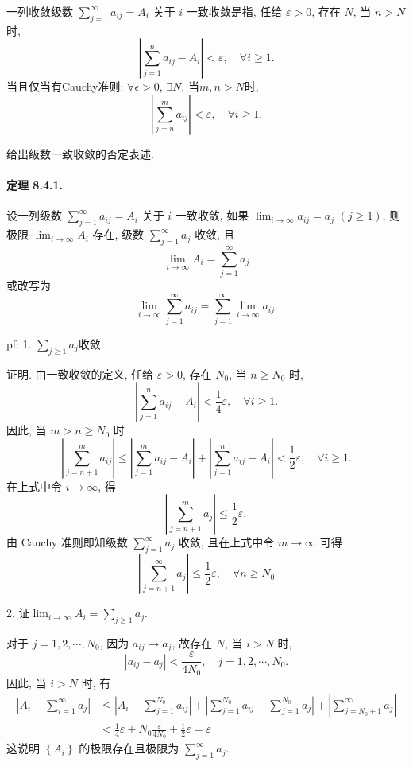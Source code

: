 一列收敛级数 $\sum_{j=1}^{\infty}a_{ij}=A_{i}$ 关于 $i$ 一致收敛是指, 任给 $\varepsilon>0$,
存在 $N$, 当 $n>N$ 时, 
\[
\left|\sum_{j=1}^{n}a_{ij}-A_{i}\right|<\varepsilon,\quad\forall i\geqslant1.
\]
当且仅当有Cauchy准则: $\forall\epsilon>0$, $\exists N$, 当$m,n>N$时, 
\[
\left|\sum_{j=n}^{m}a_{ij}\right|<\varepsilon,\quad\forall i\geqslant1.
\]

给出级数一致收敛的否定表述.

\paragraph{定理 8.4.1. }

设一列级数 $\sum_{j=1}^{\infty}a_{ij}=A_{i}$ 关于 $i$ 一致收敛, 如果 $\lim_{i\rightarrow\infty}a_{ij}=a_{j}$
$(j\geqslant1)$, 则极限 $\lim_{i\rightarrow\infty}A_{i}$ 存在, 级数 $\sum_{j=1}^{\infty}a_{j}$
收敛, 且 
\[
\lim_{i\rightarrow\infty}A_{i}=\sum_{j=1}^{\infty}a_{j}
\]
或改写为 
\[
\lim_{i\rightarrow\infty}\sum_{j=1}^{\infty}a_{ij}=\sum_{j=1}^{\infty}\lim_{i\rightarrow\infty}a_{ij}.
\]

pf: 1. $\sum_{j\ge1}a_{j}$收敛

证明. 由一致收敛的定义, 任给 $\varepsilon>0$, 存在 $N_{0}$, 当 $n\geqslant N_{0}$
时, 
\[
\left|\sum_{j=1}^{n}a_{ij}-A_{i}\right|<\frac{1}{4}\varepsilon,\quad\forall i\geqslant1.
\]
因此, 当 $m>n\geqslant N_{0}$ 时 
\[
\left|\sum_{j=n+1}^{m}a_{ij}\right|\leqslant\left|\sum_{j=1}^{m}a_{ij}-A_{i}\right|+\left|\sum_{j=1}^{n}a_{ij}-A_{i}\right|<\frac{1}{2}\varepsilon,\quad\forall i\geqslant1.
\]
在上式中令 $i\rightarrow\infty$, 得 
\[
\left|\sum_{j=n+1}^{m}a_{j}\right|\leqslant\frac{1}{2}\varepsilon,
\]
由 Cauchy 准则即知级数 $\sum_{j=1}^{\infty}a_{j}$ 收敛, 且在上式中令 $m\rightarrow\infty$
可得 
\[
\left|\sum_{j=n+1}^{\infty}a_{j}\right|\leqslant\frac{1}{2}\varepsilon,\quad\forall n\geqslant N_{0}
\]

2. 证$\lim_{i\to\infty}A_{i}=\sum_{j\ge1}a_{j}$.

对于 $j=1,2,\cdots,N_{0}$, 因为 $a_{ij}\rightarrow a_{j}$, 故存在 $N$,
当 $i>N$ 时, 
\[
\left|a_{ij}-a_{j}\right|<\frac{\varepsilon}{4N_{0}},\quad j=1,2,\cdots,N_{0}.
\]
因此, 当 $i>N$ 时, 有 
\[
\begin{aligned}\left|A_{i}-\sum_{i=1}^{\infty}a_{j}\right| & \leqslant\left|A_{i}-\sum_{j=1}^{N_{0}}a_{ij}\right|+\left|\sum_{j=1}^{N_{0}}a_{ij}-\sum_{j=1}^{N_{0}}a_{j}\right|+\left|\sum_{j=N_{0}+1}^{\infty}a_{j}\right|\\
	& <\frac{1}{4}\varepsilon+N_{0}\frac{\varepsilon}{4N_{0}}+\frac{1}{2}\varepsilon=\varepsilon
\end{aligned}
\]
这说明 $\left\{ A_{i}\right\} $ 的极限存在且极限为 $\sum_{j=1}^{\infty}a_{j}$.

